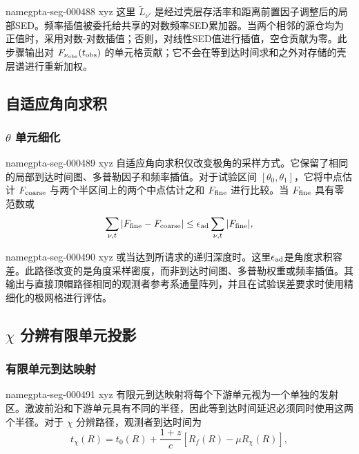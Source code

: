 \documentclass[twocolumn]{aastex702}
\makeatletter
\providecommand{\gptareaderanchor}[1]{\pdfdest name{#1} xyz}%
\providecommand{\gptareaderanchor}[1]{\special{pdf:dest (#1) [ @thispage /XYZ @xpos @ypos null ]}}%
\makeatother
\begin{document}
\gptareaderanchor{gpta-seg-000488}%
这里 \(\widetilde L_{\nu'}\) 是经过壳层存活率和距离前置因子调整后的局部SED。频率插值被委托给共享的对数频率SED累加器。当两个相邻的源仓均为正值时，采用对数-对数插值；否则，对线性SED值进行插值，空仓贡献为零。此步骤输出对 \(F_{\nu_{\rm obs}}(t_{\rm obs})\) 的单元格贡献；它不会在等到达时间求和之外对存储的壳层谱进行重新加权。

\subsection{自适应角向求积}

\subsubsection{\texorpdfstring{\(\theta\)}{theta} 单元细化}


\gptareaderanchor{gpta-seg-000489}%
自适应角向求积仅改变极角的采样方式。它保留了相同的局部到达时间图、多普勒因子和频率插值。对于试验区间 \([\theta_0,\theta_1]\)，它将中点估计 \(F_{\rm coarse}\) 与两个半区间上的两个中点估计之和 \(F_{\rm fine}\) 进行比较。当 \(F_{\rm fine}\) 具有零范数或
\begin{equation}
\sum_{\nu,t}|F_{\rm fine}-F_{\rm coarse}|
\le \epsilon_{\rm ad}
\sum_{\nu,t}|F_{\rm fine}|,
\end{equation}

\gptareaderanchor{gpta-seg-000490}%
或当达到所请求的递归深度时。这里\(\epsilon_{\rm ad}\)是角度求积容差。此路径改变的是角度采样密度，而非到达时间图、多普勒权重或频率插值。其输出与直接顶帽路径相同的观测者参考系通量阵列，并且在试验误差要求时使用精细化的极网格进行评估。

\subsection{\texorpdfstring{\(\chi\)}{chi} 分辨有限单元投影}

\subsubsection{有限单元到达映射}


\gptareaderanchor{gpta-seg-000491}%
有限元到达映射将每个下游单元视为一个单独的发射区。激波前沿和下游单元具有不同的半径，因此等到达时间延迟必须同时使用这两个半径。对于 \(\chi\) 分辨路径，观测者到达时间为
\begin{equation}
t_\chi(R)=t_0(R)+\frac{1+z}{c}
\left[R_f(R)-\mu R_\chi(R)\right],
\end{equation}
\end{document}
